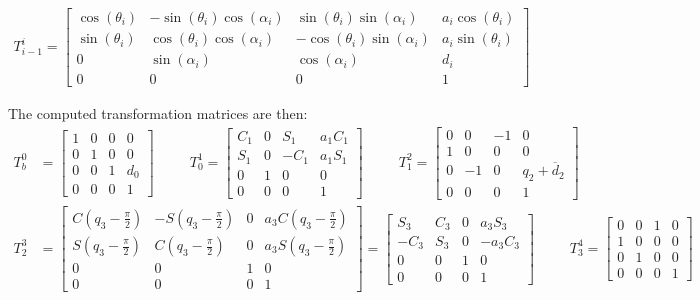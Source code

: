 \begin{align*}
T_{i-1}^i=\begin{bmatrix}
\cos(\theta_i)&-\sin(\theta_i)\cos(\alpha_i)&\sin(\theta_i)\sin(\alpha_i)&a_i\cos(\theta_i)\\
\sin(\theta_i)&\cos(\theta_i)\cos(\alpha_i)&-\cos(\theta_i)\sin(\alpha_i)&a_i\sin(\theta_i)\\
0&\sin(\alpha_i)&\cos(\alpha_i)&d_i\\
0&0&0&1
\end{bmatrix}
\end{align*}

The computed transformation matrices are then:
\begin{align*}
T_b^0&=\begin{bmatrix}
1 & 0 & 0 & 0\\ 0 & 1 & 0 & 0\\ 0 & 0 & 1 & d_0\\0 & 0 &0 &1
\end{bmatrix}
\;\;\;\;\;\;\;\;\;T_0^1=\begin{bmatrix}
C_1&0&S_1&a_1C_1\\
S_1&0&-C_1&a_1S_1\\
0&1&0&0\\
0&0&0&1
\end{bmatrix}\;\;\;\;\;\;\;\;\;
T_1^2=\begin{bmatrix}
0&0&-1&0\\
1&0&0&0\\
0&-1&0&q_2+\overline d_2\\
0&0&0&1
\end{bmatrix}\\T_2^3&=\begin{bmatrix}
C\left(q_3-\frac{\pi}{2}\right)&-S\left(q_3-\frac{\pi}{2}\right)&0&a_3C\left(q_3-\frac{\pi}{2}\right)\\
S\left(q_3-\frac{\pi}{2}\right)&C\left(q_3-\frac{\pi}{2}\right)&0&a_3S\left(q_3-\frac{\pi}{2}\right)\\
0&0&1&0\\
0&0&0&1
\end{bmatrix}=\begin{bmatrix}
S_3&C_3&0&a_3S_3\\-C_3&S_3&0&-a_3C_3\\0&0&1&0\\0&0&0&1
\end{bmatrix}\;\;\;\;\;\;\;\;\; T_3^4 = \begin{bmatrix}
0 & 0 & 1 & 0\\
1 & 0 & 0 & 0\\
0 & 1 & 0 & 0\\
0 & 0 & 0 & 1
\end{bmatrix}
\end{align*}

